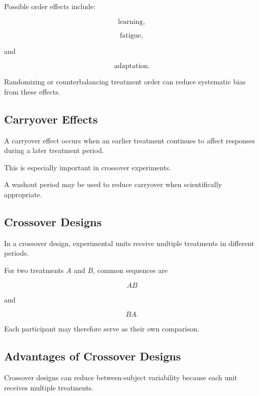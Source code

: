 Possible order effects include:

\[
\boxed{
\text{learning},
}
\]

\[
\boxed{
\text{fatigue},
}
\]

and

\[
\boxed{
\text{adaptation}.
}
\]

Randomizing or counterbalancing treatment order can reduce systematic
bias from these effects.

\subsection{Carryover Effects}
\label{subsec:carryover-effects}

A carryover effect occurs when an earlier treatment continues to affect
responses during a later treatment period.

This is especially important in crossover experiments.

A washout period may be used to reduce carryover when scientifically
appropriate.

\subsection{Crossover Designs}
\label{subsec:crossover-designs}

In a crossover design, experimental units receive multiple treatments in
different periods.

For two treatments \(A\) and \(B\), common sequences are

\[
\boxed{
AB
}
\]

and

\[
\boxed{
BA.
}
\]

Each participant may therefore serve as their own comparison.

\subsection{Advantages of Crossover Designs}
\label{subsec:crossover-advantages}

Crossover designs can reduce between-subject variability because each
unit receives multiple treatments.

